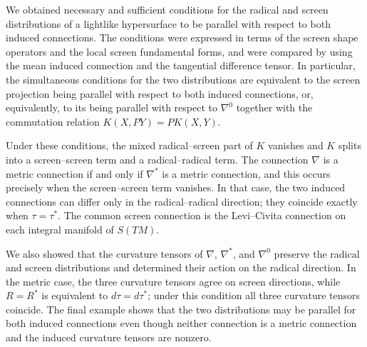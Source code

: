 \documentclass[11pt,a4paper]{article}
\theoremstyle{remark}
\theoremstyle{definition}
\begin{document}
We obtained necessary and sufficient conditions for the radical and screen
distributions of a lightlike hypersurface to be parallel with respect to both
induced connections. The conditions were expressed in terms of the screen
shape operators and the local screen fundamental forms, and were compared by
using the mean induced connection and the tangential difference tensor. In
particular, the simultaneous conditions for the two distributions are
equivalent to the screen projection being parallel with respect to both
induced connections, or, equivalently, to its being parallel with respect to
$\nabla^{0}$ together with the commutation relation
$K(X,PY)=PK(X,Y)$.

Under these conditions, the mixed radical--screen part of $K$ vanishes
and $K$ splits into a screen--screen term and a radical--radical term. The
connection $\nabla$ is a metric connection if and only if $\nabla^{*}$ is a
metric connection, and this occurs precisely when the screen--screen term
vanishes. In that case, the two induced connections can differ only in the
radical--radical direction; they coincide exactly when $\tau=\tau^{*}$. The
common screen connection is the Levi--Civita connection on each integral
manifold of $S(TM)$.

We also showed that the curvature tensors of $\nabla$, $\nabla^{*}$, and
$\nabla^{0}$ preserve the radical and screen distributions and determined
their action on the radical direction. In the metric case, the three curvature
tensors agree on screen directions, while $R=R^{*}$ is equivalent to
$d\tau=d\tau^{*}$; under this condition all three curvature tensors coincide.
The final example shows that the two distributions may be parallel for both
induced connections even though neither connection is a metric connection and
the induced curvature tensors are nonzero.

\end{document}

